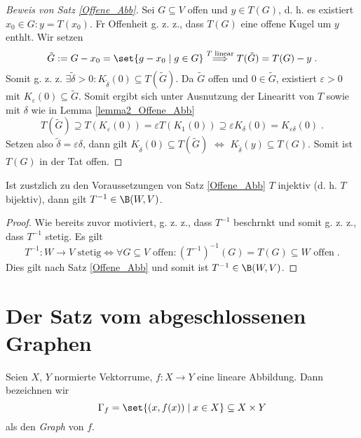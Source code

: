 \begin{proof}[Beweis von Satz \ref{Offene_Abb}]
	Sei \(G\subseteq V\) offen und \(y\in T(G)\), d. h. es existiert \(x_0 \in G: y = T(x_0)\). F\us r Offenheit g. z. z., dass \(T(G)\) eine offene Kugel um \(y\) enth\as lt. Wir setzen
	\[\tilde G : = G -x_0 = \set{g-x_0\;\vert\;g\in G} \overset{T\text{ linear}}{\Longrightarrow} T(\tilde G) = T(G) - y\;.\]
 Somit g. z. z. \(\exists \tilde \delta > 0 : K_{\tilde \delta}(0)\subseteq T(\tilde G)\). Da \(\tilde G\) offen und \(0 \in \tilde G\), existiert \(\varepsilon > 0\) mit \(K_\varepsilon(0) \subseteq \tilde G\). Somit ergibt sich unter Ausnutzung der Linearit\as t von $T$ sowie mit  \(\delta\) wie in Lemma \ref{lemma2_Offene_Abb}
 \[T(\tilde G) \supseteq T(K_\varepsilon(0)) = \varepsilon T(K_1(0)) \supseteq \varepsilon K_\delta(0) = K_{\varepsilon\delta}(0)\;. \]
 Setzen also \(\tilde \delta = \varepsilon\delta\), dann gilt \(K_{\tilde \delta}(0) \subseteq T(\tilde G)\) \(\iff\) \(K_{\tilde \delta}(y) \subseteq T(G)\). Somit ist \(T(G)\) in der Tat offen.
\end{proof}
	
\begin{theorem}[Schlussfolgerung] Ist zus\as tzlich zu den Voraussetzungen von Satz \ref{Offene_Abb} $T$ injektiv (d. h. \(T\) bijektiv), dann gilt \(T^{-1} \in \B(W,V)\).
	\label{Inverse_Mapping}
\end{theorem}
\begin{proof}
	Wie bereits zuvor motiviert, g. z. z., dass \(T^{-1} \) beschr\as nkt und somit g. z. z., dass \(T^{-1}\) stetig. Es gilt 
	\[T^{-1}: W\to V \text{ stetig} \iff \forall G \subseteq V \text{ offen}: (T^{-1})^{-1}(G) = T(G) \subseteq W \text{ offen}\;.\] 
	Dies gilt nach Satz \ref{Offene_Abb} und somit ist \(T^{-1}\in \B(W,V)\).
\end{proof}



\section{Der Satz vom abgeschlossenen Graphen}
\begin{definition}
	Seien $X$, $Y$ normierte Vektorr\as ume, \(f:X \to Y\) eine lineare Abbildung. Dann bezeichnen wir 
	\[\Gamma_f = \set{(x,f(x)) \;\vert\; x \in X}\subseteq X\times Y\]
	als den \textit{Graph} von $f$.
\end{definition}

